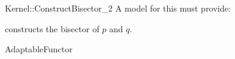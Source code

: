 \begin{ccRefFunctionObjectConcept}{Kernel::ConstructBisector_2}
A model for this must provide:


{constructs the bisector of $p$ and $q$.}

\ccRefines
AdaptableFunctor

\end{ccRefFunctionObjectConcept}
